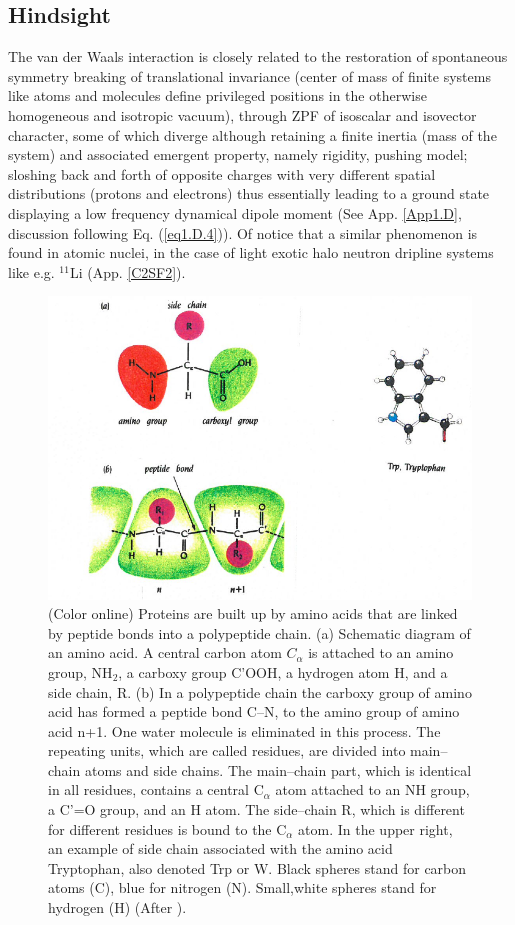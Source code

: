 \begin{subappendices}
 \subsection*{Hindsight}
 The van der Waals interaction is closely related to the restoration of spontaneous symmetry breaking of translational invariance (center of mass of finite systems like atoms and molecules define privileged positions in the otherwise homogeneous and isotropic vacuum), through ZPF of isoscalar and isovector character, some of which diverge although retaining a finite inertia (mass of the system) and associated emergent property, namely rigidity, pushing model; sloshing back and forth of opposite charges with very different spatial distributions (protons and electrons) thus essentially leading to a ground state displaying a low frequency dynamical dipole moment (See App. \ref{App1.D}, discussion following Eq. (\ref{eq1.D.4})). Of notice that a similar phenomenon is found in atomic nuclei, in the case of light exotic halo neutron dripline systems like e.g. $^{11}$Li (App. \ref{C2SF2}).

       \begin{figure}
        \centerline{\includegraphics*[width=15cm,angle=0]{nutshell/figs/fig2D7.pdf}}
        \caption{(Color online) Proteins are built up by amino acids that are linked by peptide bonds into a polypeptide chain. (a) Schematic diagram of an amino acid. A central carbon atom $C_\alpha$ is attached to an amino group, NH$_2$, a carboxy group C'OOH, a hydrogen atom H, and a side chain, R. (b) In a polypeptide chain the carboxy group of amino acid has formed a peptide bond C--N, to the amino group of amino acid n+1. One water molecule is eliminated in this process. The repeating units, which are called residues, are divided into main--chain atoms and side chains. The main--chain part, which is identical in all residues, contains a central C$_\alpha$ atom attached to an NH group, a C'=O group, and an H atom. The side--chain R, which is different for different residues is bound to the C$_\alpha$ atom. In the upper right, an example of side chain associated with the amino acid Tryptophan, also denoted Trp or W. Black spheres stand for carbon atoms (C), blue for nitrogen (N). Small,white spheres stand for hydrogen (H) (After \cite{Branden:91}).}\label{fig2.D.7}
        \end{figure}
       

\end{subappendices}
